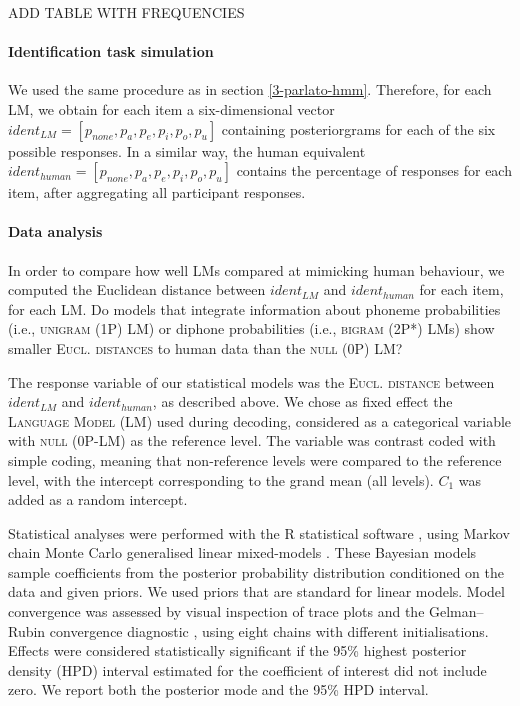 {\color{red}ADD TABLE WITH FREQUENCIES}


\paragraph{Identification task simulation}
We used the same procedure as in section \ref{3-parlato-hmm}. Therefore, for each LM, we obtain for each item a six-dimensional vector $ident_{LM} = [p_{none}, p_{a}, p_{e}, p_{i}, p_{o}, p_{u}]$ containing posteriorgrams for each of the six possible responses. In a similar way, the human equivalent $ident_{human} = [p_{none}, p_{a}, p_{e}, p_{i}, p_{o}, p_{u}]$ contains the percentage of responses for each item, after aggregating all participant responses. 

\paragraph{Data analysis}
In order to compare how well LMs compared at mimicking human behaviour, we computed the Euclidean distance between $ident_{LM}$ and $ident_{human}$ for each item, for each LM. Do models that integrate information about phoneme probabilities (i.e., \textsc{unigram (1P)} LM) or diphone probabilities (i.e., \textsc{bigram (2P*)} LMs) show smaller \textsc{Eucl. distances} to human data than the \textsc{null (0P)} LM?

The response variable of our statistical models was the \textsc{Eucl. distance} between $ident_{LM}$ and $ident_{human}$, as described above.  
We chose as fixed effect the \textsc{Language Model} (\textsc{LM}) used during decoding, considered as a categorical variable with \textsc{null (0P-LM)} as the reference level. The variable was contrast coded with simple coding, meaning that non-reference levels were compared to the reference level, with the intercept corresponding to the grand mean (all levels).
\textsc{$C_{1}$} was added as a random intercept.

Statistical analyses were performed with the R statistical software \cite{R-base}, using Markov chain Monte Carlo generalised linear mixed-models \cite{R-MCMCglmm, R-coda}. These Bayesian models sample coefficients from the posterior probability distribution conditioned on the data and given priors. We used priors that are standard for linear models. Model convergence was assessed by visual inspection of trace plots and the Gelman–Rubin convergence diagnostic \cite{gelman1992}, using eight chains with different initialisations. Effects were considered statistically significant if the 95\% highest posterior density (HPD) interval estimated for the coefficient of interest did not include zero. We report both the posterior mode and the 95\% HPD interval.  

